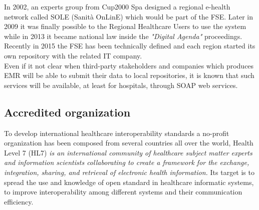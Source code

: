 In 2002, an experts group from Cup2000 Spa designed a regional e-health network called SOLE (Sanità OnLinE) which would be part of the FSE. Later in 2009 it was finally possible to the Regional Healthcare Users to use the system while in 2013 it became national law inside the \textit{"Digital Agenda"} proceedings.\\
Recently in 2015 the FSE has been technically defined and each region started its own repository with the related IT company.
\cite{smarthealth}\\
Even if it not clear when third-party stakeholders and companies which produces EMR will be able to submit their data to local repositories, it is known that such services will be available, at least for hospitals, through SOAP web services.

\subsection{Accredited organization}
To develop international healthcare interoperability standards a no-profit organization has been composed from several countries all over the world, Health Level 7 (HL7) \textit{is an international community of healthcare subject matter experts and information scientists collaborating to create a framework for the exchange, integration, sharing, and retrieval of electronic health information.} Its target is to spread the use and knowledge of open standard in healthcare informatic systems, to improve interoperability among different systems and their communication efficiency. \cite{health_level_seven}


